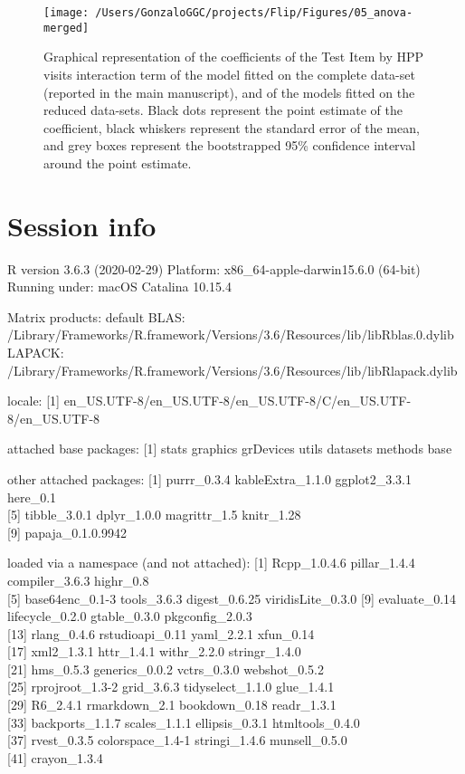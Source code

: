 \documentclass[english,man,man,floatsintext]{apa6}
\begin{document}
\begin{appendix}
\begin{figure}
\texttt{[image: /Users/GonzaloGGC/projects/Flip/Figures/05\_anova-merged]} \caption{Graphical representation of the coefficients of the Test Item by HPP visits interaction term of the model fitted on the complete data-set (reported in the main manuscript), and of the models fitted on the reduced data-sets. Black dots represent the point estimate of the coefficient, black whiskers represent the standard error of the mean, and grey boxes represent the bootstrapped 95\% confidence interval around the point estimate.}\label{fig:unnamed-chunk-16}
\end{figure}

\hypertarget{session-info}{%
\section{Session info}\label{session-info}}

R version 3.6.3 (2020-02-29) Platform: x86\_64-apple-darwin15.6.0
(64-bit) Running under: macOS Catalina 10.15.4

Matrix products: default BLAS:
/Library/Frameworks/R.framework/Versions/3.6/Resources/lib/libRblas.0.dylib
LAPACK:
/Library/Frameworks/R.framework/Versions/3.6/Resources/lib/libRlapack.dylib

locale: {[}1{]}
en\_US.UTF-8/en\_US.UTF-8/en\_US.UTF-8/C/en\_US.UTF-8/en\_US.UTF-8

attached base packages: {[}1{]} stats graphics grDevices utils datasets
methods base

other attached packages: {[}1{]} purrr\_0.3.4 kableExtra\_1.1.0
ggplot2\_3.3.1 here\_0.1\\
{[}5{]} tibble\_3.0.1 dplyr\_1.0.0 magrittr\_1.5 knitr\_1.28\\
{[}9{]} papaja\_0.1.0.9942

loaded via a namespace (and not attached): {[}1{]} Rcpp\_1.0.4.6
pillar\_1.4.4 compiler\_3.6.3 highr\_0.8\\
{[}5{]} base64enc\_0.1-3 tools\_3.6.3 digest\_0.6.25 viridisLite\_0.3.0
{[}9{]} evaluate\_0.14 lifecycle\_0.2.0 gtable\_0.3.0 pkgconfig\_2.0.3\\
{[}13{]} rlang\_0.4.6 rstudioapi\_0.11 yaml\_2.2.1 xfun\_0.14\\
{[}17{]} xml2\_1.3.1 httr\_1.4.1 withr\_2.2.0 stringr\_1.4.0\\
{[}21{]} hms\_0.5.3 generics\_0.0.2 vctrs\_0.3.0 webshot\_0.5.2\\
{[}25{]} rprojroot\_1.3-2 grid\_3.6.3 tidyselect\_1.1.0 glue\_1.4.1\\
{[}29{]} R6\_2.4.1 rmarkdown\_2.1 bookdown\_0.18 readr\_1.3.1\\
{[}33{]} backports\_1.1.7 scales\_1.1.1 ellipsis\_0.3.1
htmltools\_0.4.0\\
{[}37{]} rvest\_0.3.5 colorspace\_1.4-1 stringi\_1.4.6 munsell\_0.5.0\\
{[}41{]} crayon\_1.3.4


\end{appendix}
\end{document}
